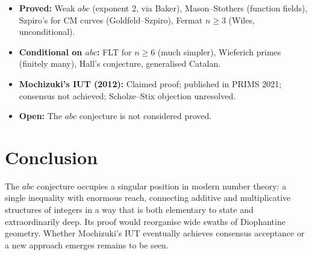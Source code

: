 \documentclass[12pt,a4paper]{article}
\theoremstyle{remark}
\begin{document}
\begin{itemize}[nosep]
  \item \textbf{Proved:} Weak $abc$ (exponent $2$, via Baker), Mason--Stothers (function fields),
    Szpiro's for CM curves (Goldfeld--Szpiro), Fermat $n\geq 3$ (Wiles, unconditional).
  \item \textbf{Conditional on $abc$:} FLT for $n\geq 6$ (much simpler), Wieferich primes
    (finitely many), Hall's conjecture, generalised Catalan.
  \item \textbf{Mochizuki's IUT (2012):} Claimed proof; published in PRIMS 2021; consensus
    not achieved; Scholze--Stix objection unresolved.
  \item \textbf{Open:} The $abc$ conjecture is not considered proved.
\end{itemize}

\section{Conclusion}

The $abc$ conjecture occupies a singular position in modern number theory: a single
inequality with enormous reach, connecting additive and multiplicative structures of
integers in a way that is both elementary to state and extraordinarily deep.  Its proof
would reorganise wide swaths of Diophantine geometry.  Whether Mochizuki's IUT
eventually achieves consensus acceptance or a new approach emerges remains to be seen.
\end{document}
